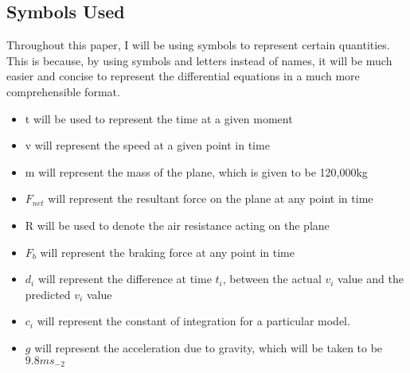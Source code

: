 \subsection{Symbols Used}
Throughout this paper, I will be using symbols to represent certain quantities. This is because, by using symbols and letters instead of names, it will be much easier and concise to represent the differential equations in a much more comprehensible format.

\begin{itemize}
  \item {t} will be used to represent the time at a given moment
  \item {v} will represent the speed at a given point in time
  \item {m} will represent the mass of the plane, which is given to be 120,000kg
  \item {$F_{net}$} will represent the resultant force on the plane at any point in time
  \item {R} will be used to denote the air resistance acting on the plane
  \item $F_b$ will represent the braking force at any point in time
  \item $d_i$ will represent the difference at time $t_i$, between the actual $v_i$ value and the predicted $v_i$ value
  \item $c_i$ will represent the constant of integration for a particular model.
  \item $g$ will represent the acceleration due to gravity, which will be taken to be $9.8ms_{-2}$
\end{itemize}